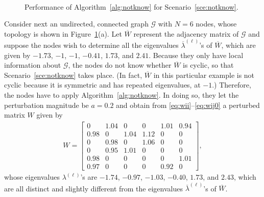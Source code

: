 \documentclass[11pt]{article}
\theoremstyle{plain}
\theoremstyle{definition}
\theoremstyle{remark}
\begin{document}
\begin{figure}[tb]
\centering{}\quad{}\\ \quad{}
\caption{Performance of Algorithm~\ref{alg:notknow} for Scenario~\ref{sce:notknow}.}
\label{fig:sce2}
\end{figure}

Consider next an undirected, connected graph $\mathcal{G}$ with $N=6$ nodes, whose topology is shown in Figure~\ref{fig:sce2}(a). Let $\overline{W}$ represent the adjacency matrix of $\mathcal{G}$ and suppose the nodes wish to determine all the eigenvalues $\overline{\lambda}^{(\ell)}$'s of $\overline{W}$, which are given by $-1.73$, $-1$, $-1$, $-0.41$, $1.73$, and $2.41$. Because they only have local information about $\mathcal{G}$, the nodes do not know whether $\overline{W}$ is cyclic, so that Scenario~\ref{sce:notknow} takes place. (In fact, $\overline{W}$ in this particular example is not cyclic because it is symmetric and has repeated eigenvalues, at $-1$.) Therefore, the nodes have to apply Algorithm~\ref{alg:notknow}. In doing so, they let the perturbation magnitude be $a=0.2$ and obtain from \eqref{eq:wii}--\eqref{eq:wij0} a perturbed matrix $W$ given by
\begin{align*}
W=\begin{bmatrix}0 & 1.04 & 0 & 0 & 1.01 & 0.94\\ 0.98 & 0 & 1.04 & 1.12 & 0 & 0\\ 0 & 0.98 & 0 & 1.06 & 0 & 0\\0 & 0.95 & 1.01 & 0 & 0 & 0\\ 0.98 & 0 & 0 & 0 & 0 & 1.01\\ 0.97 & 0 & 0 & 0 & 0.92 & 0\end{bmatrix},
\end{align*}
whose eigenvalues $\lambda^{(\ell)}$'s are $-1.74$, $-0.97$, $-1.03$, $-0.40$, $1.73$, and $2.43$, which are all distinct and slightly different from the eigenvalues $\overline{\lambda}^{(\ell)}$'s of $\overline{W}$.
\end{document}
